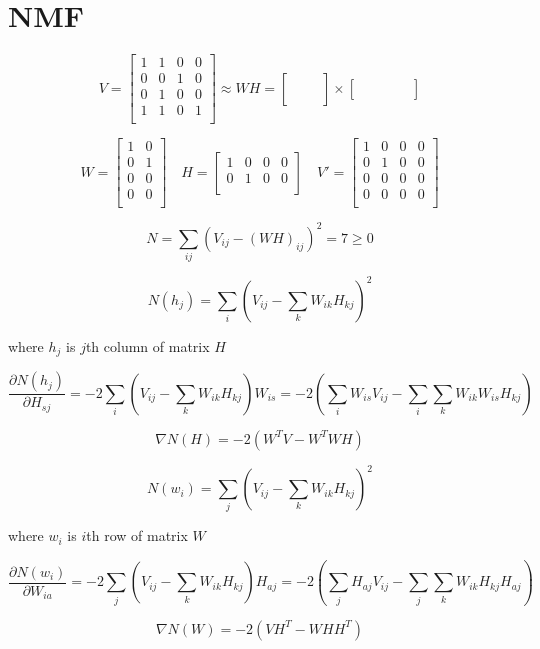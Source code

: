 \documentclass{extreport}
\begin{document}
\section{NMF}

\[
  V = 
  \begin{bmatrix}
    1 & 1 & 0 & 0 \\
    0 & 0 & 1 & 0 \\
    0 & 1 & 0 & 0 \\
    1 & 1 & 0 & 1 \\
  \end{bmatrix}
  \approx WH =
  \begin{bmatrix}
    & & \\
    & & \\
    & & \\
    & & \\
  \end{bmatrix}
  \times
  \begin{bmatrix}
    & & & & \\
    & & & & \\
  \end{bmatrix}
\]

\[
  W =
  \begin{bmatrix}
    1 & 0 \\
    0 & 1 \\
    0 & 0 \\
    0 & 0 \\
  \end{bmatrix} \quad
  H =
  \begin{bmatrix}
    1 & 0 & 0 & 0 \\
    0 & 1 & 0 & 0 \\
  \end{bmatrix} \quad
  V' =
  \begin{bmatrix}
    1 & 0 & 0 & 0 \\
    0 & 1 & 0 & 0 \\
    0 & 0 & 0 & 0 \\
    0 & 0 & 0 & 0 \\
  \end{bmatrix}
\]

\[
  N = \sum_{ij}
  \left(
    V_{ij} - (WH)_{ij}
  \right)^2
  = 7 \geqslant 0
\]

\[
  N(h_j) = \sum_{i}
  \left(
    V_{ij} - \sum_{k}W_{ik}H_{kj}
  \right)^2
\]

where $h_j$ is $j$th column of matrix $H$

\[
  \frac{\partial N(h_j)}{\partial H_{sj}} =
  -2 \sum_i
    \left(
      V_{ij} - \sum_k W_{ik}H_{kj}
    \right)
  W_{is} =
  -2
    \left(
      \sum_i W_{is}V_{ij} - \sum_i\sum_kW_{ik}W_{is}H_{kj}
    \right)
\]

\[
  \nabla N(H) = -2 ( W^TV - W^TWH )
\]

\[
  N(w_i) = \sum_j \left( V_{ij} - \sum_k W_{ik}H_{kj} \right)^2
\]

where $w_i$ is $i$th row of matrix $W$

\[
  \frac{\partial N(w_i)}{\partial W_{ia}} =
  -2 \sum_j
    \left(
      V_{ij} - \sum_k W_{ik}H_{kj}
    \right)
  H_{aj} =
  -2
    \left(
      \sum_j H_{aj}V_{ij} - \sum_j \sum_k W_{ik}H_{kj}H_{aj}
    \right)
\]

\[
  \nabla N(W) = -2 ( VH^T - WHH^T )
\]
\end{document}
